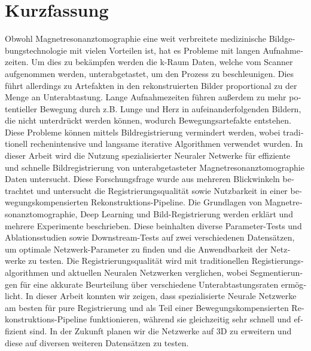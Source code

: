 \chapter*{Kurzfassung}
\begin{otherlanguage}{ngerman}
Obwohl Magnetresonanztomographie eine weit verbreitete medizinische Bildgebungstechnologie mit vielen Vorteilen ist, hat es Probleme mit langen Aufnahmezeiten. Um dies zu bekämpfen werden die k-Raum Daten, welche vom Scanner aufgenommen werden, unterabgetastet, um den Prozess zu beschleunigen. Dies führt allerdings zu Artefakten in den rekonstruierten Bilder proportional zu der Menge an Unterabtastung. Lange Aufnahmezeiten führen außerdem zu mehr potentieller Bewegung durch z.B. Lunge und Herz in aufeinanderfolgenden Bildern, die nicht unterdrückt werden können, wodurch Bewegungsartefakte entstehen. Diese Probleme können mittels Bildregistrierung vermindert werden, wobei traditionell rechenintensive und langsame iterative Algorithmen verwendet wurden. In dieser Arbeit wird die Nutzung spezialisierter Neuraler Netwerke für effiziente und schnelle Bildregistrierung von unterabgetasteter Magnetresonanztomographie Daten untersucht. Diese Forschungsfrage wurde aus mehreren Blickwinkeln betrachtet und untersucht die Registrierungsqualität sowie Nutzbarkeit in einer bewegungskompensierten Rekonstruktions-Pipeline. Die Grundlagen von Magnetresonanztomographie, Deep Learning und Bild-Registrierung werden erklärt und mehrere Experimente beschrieben. Diese beinhalten diverse Parameter-Tests und Ablationsstudien sowie Downstream-Tests auf zwei verschiedenen Datensätzen, um optimale Netzwerk-Parameter zu finden und die Anwendbarkeit der Netzwerke zu testen. Die Registrierungsqualität wird mit traditionellen Registierungsalgorithmen und aktuellen Neuralen Netzwerken verglichen,  wobei Segmentierungen für eine akkurate Beurteilung über verschiedene Unterabtastungsraten ermöglicht. In dieser Arbeit konnten wir zeigen, dass spezialisierte Neurale Netzwerke am besten für pure Registrierung und als Teil einer Bewegungskompensierten Rekonstruktions-Pipeline funktionieren, während sie gleichzeitig sehr schnell und effizient sind. In der Zukunft planen wir die Netzwerke auf 3D zu erweitern und diese auf diversen weiteren Datensätzen zu testen.
\end{otherlanguage}